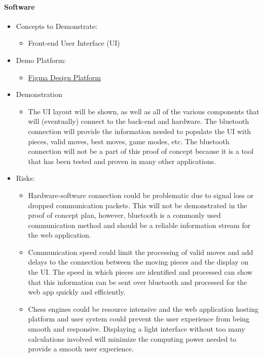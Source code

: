 \documentclass{article}
\begin{document}
\paragraph{Software}
\begin{itemize}
    \item Concepts to Demonstrate:
    \begin{itemize}
        \item Front-end User Interface (UI)
    \end{itemize}
    \item Demo Platform:
    \begin{itemize}
        \item \href{https://www.figma.com/}{Figma Design Platform}
    \end{itemize}
    \item Demonstration
    \begin{itemize}
        \item The UI layout will be shown, as well as all of the various components that will (eventually) connect to the back-end and hardware. The bluetooth connection will provide the information needed to populate the UI with pieces, valid moves, best moves, game modes, etc. The bluetooth connection will not be a part of this proof of concept because it is a tool that has been tested and proven in many other applications. 
    \end{itemize}
    \item Risks:
    \begin{itemize}
        \item Hardware-software connection could be problematic due to signal loss or dropped communication packets. This will not be demonstrated in the proof of concept plan, however, bluetooth is a commonly used communication method and should be a reliable information stream for the web application.
        \item Communication speed could limit the processing of valid moves and add delays to the connection between the moving pieces and the display on the UI. The speed in which pieces are identified and processed can show that this information can be sent over bluetooth and processed for the web app quickly and efficiently.
        \item Chess engines could be resource intensive and the web application hosting platform and user system could prevent the user experience from being smooth and responsive. Displaying a light interface without too many calculations involved will minimize the computing power needed to provide a smooth user experience.
    \end{itemize}
\end{itemize}
\end{document}
